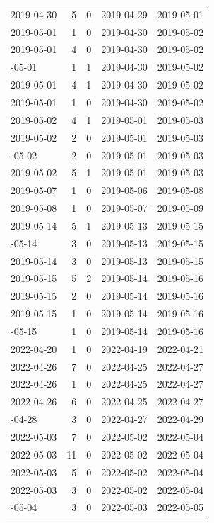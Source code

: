 \documentclass[
]{article}
\begin{document}
\begin{longtable}{lrrll}
2019-04-30 & 5 & 0 & 2019-04-29 & 2019-05-01\\
2019-05-01 & 1 & 0 & 2019-04-30 & 2019-05-02\\
2019-05-01 & 4 & 0 & 2019-04-30 & 2019-05-02\\
\addlinespace
2019-05-01 & 1 & 1 & 2019-04-30 & 2019-05-02\\
2019-05-01 & 4 & 1 & 2019-04-30 & 2019-05-02\\
2019-05-01 & 1 & 0 & 2019-04-30 & 2019-05-02\\
2019-05-02 & 4 & 1 & 2019-05-01 & 2019-05-03\\
2019-05-02 & 2 & 0 & 2019-05-01 & 2019-05-03\\
\addlinespace
2019-05-02 & 2 & 0 & 2019-05-01 & 2019-05-03\\
2019-05-02 & 5 & 1 & 2019-05-01 & 2019-05-03\\
2019-05-07 & 1 & 0 & 2019-05-06 & 2019-05-08\\
2019-05-08 & 1 & 0 & 2019-05-07 & 2019-05-09\\
2019-05-14 & 5 & 1 & 2019-05-13 & 2019-05-15\\
\addlinespace
2019-05-14 & 3 & 0 & 2019-05-13 & 2019-05-15\\
2019-05-14 & 3 & 0 & 2019-05-13 & 2019-05-15\\
2019-05-15 & 5 & 2 & 2019-05-14 & 2019-05-16\\
2019-05-15 & 2 & 0 & 2019-05-14 & 2019-05-16\\
2019-05-15 & 1 & 0 & 2019-05-14 & 2019-05-16\\
\addlinespace
2019-05-15 & 1 & 0 & 2019-05-14 & 2019-05-16\\
2022-04-20 & 1 & 0 & 2022-04-19 & 2022-04-21\\
2022-04-26 & 7 & 0 & 2022-04-25 & 2022-04-27\\
2022-04-26 & 1 & 0 & 2022-04-25 & 2022-04-27\\
2022-04-26 & 6 & 0 & 2022-04-25 & 2022-04-27\\
\addlinespace
2022-04-28 & 3 & 0 & 2022-04-27 & 2022-04-29\\
2022-05-03 & 7 & 0 & 2022-05-02 & 2022-05-04\\
2022-05-03 & 11 & 0 & 2022-05-02 & 2022-05-04\\
2022-05-03 & 5 & 0 & 2022-05-02 & 2022-05-04\\
2022-05-03 & 3 & 0 & 2022-05-02 & 2022-05-04\\
\addlinespace
2022-05-04 & 3 & 0 & 2022-05-03 & 2022-05-05\\

\end{longtable}
\end{document}
